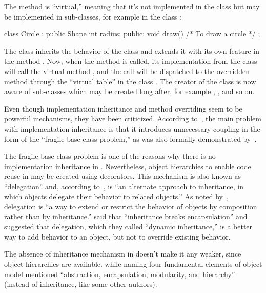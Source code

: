 The method  is ``virtual,'' meaning that it's not implemented in the class
 but may be implemented in sub-classes, for example in
the class :

\begin{ffcode}
class Circle : public Shape {
  int radius;
public:
  void draw() { /* To draw a circle */ }
};
\end{ffcode}

The class  inherits the behavior of the class  and
extends it with its own feature in the method . Now, when the
method  is called, its implementation from the class 
will call the virtual method , and the call will be dispatched
to the overridden method  through the ``virtual table'' in the class .
The creator of the class  is now aware of sub-classes
which may be created long after, for example , , and so on.

Even though implementation inheritance and method overriding seem to
be powerful mechanisms, they have been criticized.
According to~\citet{holub2003extends}, the main problem with
implementation inheritance is that it introduces unnecessary coupling
in the form of the ``fragile base class problem,''
as was also formally demonstrated by~\citet{mikhajlov1998study}.

The fragile base class problem is one of the reasons why
there is no implementation inheritance in \phic{}.
Nevertheless, object hierarchies to enable code reuse
in \phic{} may be created using decorators.
This mechanism is also known as ``delegation'' and, according
to~\citet[p.98]{grady2007object}, is ``an alternate approach to inheritance, in which
objects delegate their behavior to related objects.''
As noted by~\citet[p.139]{west2004object}, delegation is ``a way to extend or restrict
the behavior of objects by composition rather than by inheritance.''
\citet{seiter1998evolution} said that ``inheritance breaks encapsulation'' and suggested that
delegation, which they called ``dynamic inheritance,'' is a better way
to add behavior to an object, but not to override existing behavior.

The absence of inheritance mechanism in \phic{} doesn't make it
any weaker, since object hierarchies are available. \citet{grady2007object}
while naming four fundamental elements of object model mentioned
``abstraction, encapsulation, modularity, and hierarchy'' (instead of inheritance, like
some other authors).

